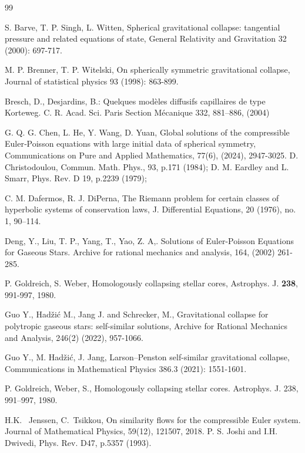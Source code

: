 \documentclass[reqno]{article}%
\theoremstyle{plain}
\theoremstyle{definition}
\theoremstyle{remark}
\numberwithin{equation}{section}
\begin{document}
\begin{thebibliography}{99} 


 S. Barve, T. P. Singh,  L. Witten, Spherical gravitational collapse: tangential pressure and related equations of state, General Relativity and Gravitation 32 (2000): 697-717.

 M. P. Brenner, T. P. Witelski, On spherically symmetric gravitational collapse, Journal of statistical physics 93 (1998): 863-899.

 Bresch, D., Desjardins, B.: Quelques modèles diffusifs capillaires de
type Korteweg. C. R. Acad. Sci. Paris Section Mécanique 332, 881–886, (2004)

 G. Q. G. Chen, L. He, Y. Wang, D. Yuan,  Global solutions of the compressible Euler‐Poisson equations with large initial data of spherical symmetry, Communications on Pure and Applied Mathematics, 77(6), (2024), 2947-3025.
 D. Christodoulou, Commun. Math. Phys., 93, p.171 (1984);
 D. M. Eardley and L. Smarr, Phys. Rev. D 19, p.2239 (1979);

 C. M. Dafermos, R. J. DiPerna, The Riemann problem for certain classes of hyperbolic systems of conservation laws, J. Differential Equations, 20 (1976), no. 1, 90–114.

 Deng, Y., Liu, T. P., Yang, T., Yao, Z. A,. Solutions of Euler-Poisson Equations for Gaseous Stars. Archive for rational mechanics and analysis, 164,  (2002) 261-285.

 P. Goldreich, S. Weber, Homologously collapsing stellar cores, Astrophys. J. {\bf 238}, 991-997, 1980. 

 Guo Y., Hadžić M., Jang J. and Schrecker, M., Gravitational collapse for polytropic gaseous stars: self-similar solutions, Archive for Rational Mechanics and Analysis, 246(2) (2022), 957-1066.

 Guo Y., M. Hadžić,  J. Jang, Larson–Penston self-similar gravitational collapse, Communications in Mathematical Physics 386.3 (2021): 1551-1601.

 P. Goldreich,  Weber, S., Homologously collapsing stellar cores. Astrophys. J. 238,
991–997, 1980.


 H.K. \ Jenssen, C.\ Tsikkou, On similarity flows for the compressible Euler system. Journal of Mathematical Physics, 59(12), 121507, 2018.
 P. S. Joshi and I.H. Dwivedi, Phys. Rev. D47, p.5357 (1993).


\end{thebibliography}
\end{document}
